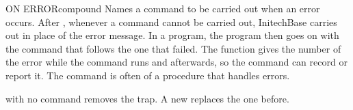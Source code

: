 \begin{XbaseEntry}{ON ERROR}{compound}
%
Names a command to be carried out when an error occurs.
\Syntax
{}
\Usage
After  , whenever a command cannot be carried out,
InitechBase carries out  in place of the error message.  In a
program, the program then goes on with the command that follows the one that
failed.  The function  gives the number of the error while the
command runs and afterwards, so the command can record or report it.  The
command is often  of a procedure that handles errors.

 with no command removes the trap.  A new  replaces
the one before.
\Examples
{}
\end{XbaseEntry}

